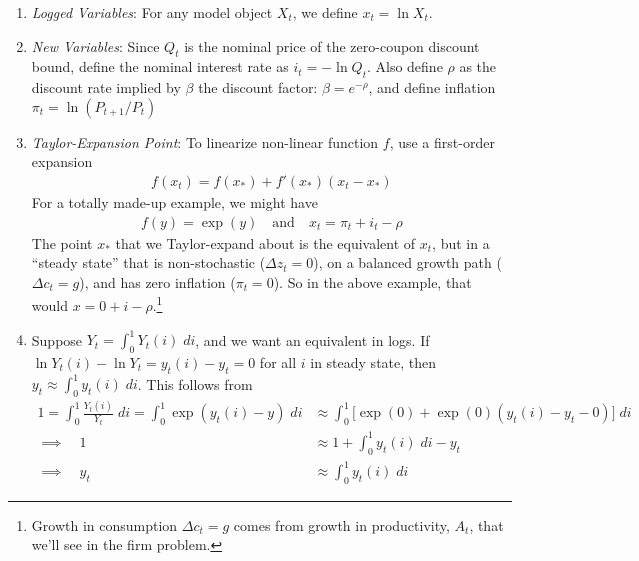 \documentclass[12pt]{article}
\theoremstyle{plain}
\theoremstyle{definition}
\theoremstyle{remark}
\begin{document}
\begin{enumerate}
  \item \emph{Logged Variables}:
    For any model object $X_t$, we define
    $x_t = \ln X_t$.

  \item \emph{New Variables}:
    Since $Q_t$ is the nominal price of the zero-coupon discount bound,
    define the nominal interest rate as $i_t = -\ln Q_t$. Also define
    $\rho$ as the discount rate implied by $\beta$ the discount factor:
    $\beta = e^{-\rho}$, and define inflation $\pi_t=\ln(P_{t+1}/P_t)$

  \item \emph{Taylor-Expansion Point}:
    To linearize non-linear function $f$, use a first-order expansion
    \begin{align*}
      f(x_t) = f(x_*) + f'(x_*)(x_t-x_*)
    \end{align*}
    For a totally made-up example, we might have
    \begin{align*}
      f(y)=\exp(y)\quad\text{and}\quad
      x_t = \pi_t + i_t - \rho
    \end{align*}
    The point $x_*$ that we Taylor-expand about is the equivalent of
    $x_t$, but in a ``steady state'' that is non-stochastic
    ($\Delta z_t=0$), on a balanced growth path ($\Delta c_t =g$), and
    has zero inflation ($\pi_t=0$). So in the above example, that would
    $x=0+i-\rho$.\footnote{%
      Growth in consumption $\Delta c_t=g$ comes from growth in
      productivity, $A_t$, that we'll see in the firm problem.
    }

  \item
    Suppose $Y_t=\int_0^1 Y_t(i)\; di$, and we want an equivalent in
    logs. If $\ln Y_t(i) - \ln Y_t = y_t(i)-y_t=0$ for all $i$ in steady
    state, then $y_t \approx \int_0^1 y_t(i)\;di$. This follows from
    \begin{align*}
      1
      = \int_0^1 \frac{Y_t(i)}{Y_t}\; di
      = \int_0^1 \exp(y_t(i)-y)\; di
      &\approx
      \int_0^1 \big[\exp(0) + \exp(0)(y_t(i)-y_t-0)\big]\; di
      \\
      \implies\quad 1
      &\approx 1 + \int_0^1 y_t(i)\; di -y_t
      \\
      \implies\quad y_t
      &\approx \int_0^1 y_t(i)\; di
    \end{align*}
\end{enumerate}
\end{document}
